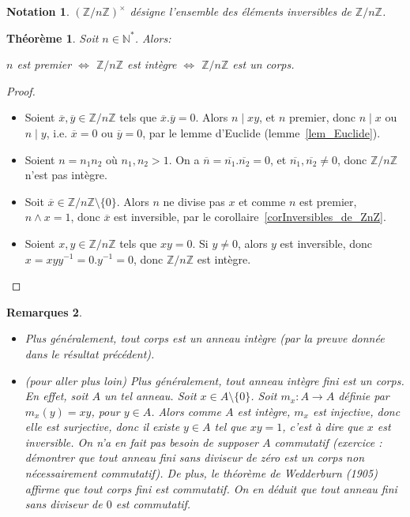 \documentclass[12pt]{report}
\newtheorem{thm}{Théorème}[chapter]
\newtheorem{remarques}[thm]{Remarques}
\newtheorem*{nota}{Notation}
\begin{document}
\begin{nota}
$(\mathbb{Z}/n\mathbb{Z})^{\times}$ désigne l'ensemble des éléments inversibles de $\mathbb{Z}/n\mathbb{Z}$.
\end{nota}

\begin{thm}
Soit $n \in \mathbb{N}^*$. Alors:\par 
$n$ est premier $\Longleftrightarrow$ $\mathbb{Z} / n \mathbb{Z}$ est intègre $\Longleftrightarrow$ $\mathbb{Z}/n\mathbb{Z}$ est un corps.
\end{thm}


\begin{proof}\
\begin{itemize}
\item[« (1) $ \Rightarrow$ (2) »] Soient $\overline{x},\overline{y} \in \mathbb{Z}/n\mathbb{Z}$ tels que $\overline{x}.\overline{y}=0$. Alors $n \mid xy$, et $n$ premier, donc $n \mid x$ ou $n \mid y$, i.e. $\overline{x}=0$ ou $\overline{y}=0$, par le lemme d'Euclide (lemme~\ref{lem_Euclide}).
\item[« (2) $\Rightarrow$ (1) »] Soient $n=n_1 n_2$ où $n_1,n_2 >1$. On a $\overline{n}=\overline{n_1}.\overline{n_2}=0$, et $\overline{n_1},\overline{n_2}\neq 0$, donc $\mathbb{Z}/n\mathbb{Z}$ n'est pas intègre.
\item[« (1) $\Rightarrow$ (3) »] Soit $\overline{x} \in \mathbb{Z}/n \mathbb{Z}\setminus\{0\}$. Alors $n$ ne divise pas $x$ et comme $n$ est premier, $n\wedge x=1$, donc $\overline{x}$ est inversible, par le corollaire~\ref{corInversibles_de_ZnZ}.
\item[« (3) $\Rightarrow$ (2) »]    Soient $x,y \in \mathbb{Z}/n \mathbb{Z}$ tels que $xy=0$. Si $y \neq 0$, alors $y$ est inversible, donc $x=xyy^{-1}=0. y^{-1}=0$, donc $\mathbb{Z}/n\mathbb{Z}$ est intègre.
\end{itemize}
\end{proof}


\begin{remarques}
\begin{itemize}
\item[•] Plus généralement, tout corps est un anneau intègre (par la preuve donnée dans le résultat précédent).

\item[•] (pour aller plus loin) Plus généralement, tout anneau intègre fini est un corps. En effet, soit $A$ un tel anneau. Soit $x\in A\setminus \{ 0\}$. Soit $m_x:A\rightarrow A$ définie par $m_x(y)=xy$, pour $y\in A$. Alors comme $A$ est intègre, $m_x$ est injective, donc elle est surjective, donc il existe $y\in A$ tel que $xy=1$, c'est à dire que $x$ est inversible. On n'a en fait pas besoin de supposer $A$ commutatif (exercice : démontrer que tout anneau fini sans diviseur de zéro est un corps non nécessairement commutatif). De plus, le théorème de Wedderburn (1905) affirme que tout corps fini est commutatif. On en déduit que tout anneau fini sans diviseur de $0$ est commutatif.
\end{itemize}
\end{remarques}
\end{document}
